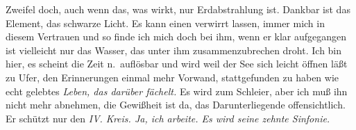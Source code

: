 \documentclass[
]{article}
\begin{document}
Zweifel doch, auch wenn das, was wirkt, nur Erdabstrahlung ist. Dankbar
ist das Element, das schwarze Licht. Es kann einen verwirrt lassen,
immer mich in diesem Vertrauen und so finde ich mich doch bei ihm, wenn
er klar aufgegangen ist vielleicht nur das Wasser, das unter ihm
zusammenzubrechen droht. Ich bin hier, es scheint die Zeit n.~auflösbar
und wird weil der See sich leicht öffnen läßt zu Ufer, den Erinnerungen
einmal mehr Vorwand, stattgefunden zu haben wie echt gelebtes
\emph{Leben, das darüber fächelt. }Es wird zum Schleier, aber ich muß
ihn nicht mehr abnehmen, die Gewißheit ist da, das Darunterliegende
offensichtlich.\\
Er schützt nur den \emph{IV. Kreis. Ja, ich arbeite. Es wird seine
zehnte Sinfonie.}
\end{document}
